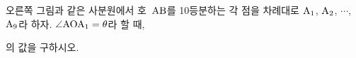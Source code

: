 \noindent\begin{minipage}[t]{0.58\linewidth}\vspace{0pt}\raggedright 오른쪽 그림과 같은 사분원에서 호~$\mathrm{AB}$를 10등분하는 각 점을 차례대로 $\mathrm{A_1}$, $\mathrm{A_2}$, $\cdots$, $\mathrm{A_9}$라 하자. $\angle\mathrm{AOA_1}=\theta$라 할 때,\par\smallskip\end{minipage}\hfill\begin{minipage}[t]{0.4\linewidth}\vspace{0pt}\centering \resizebox{\ifdim\width>\linewidth\linewidth\else\width\fi}{!}{}\end{minipage}\par
\noindent {}\par\smallskip\noindent 의 값을 구하시오. 
